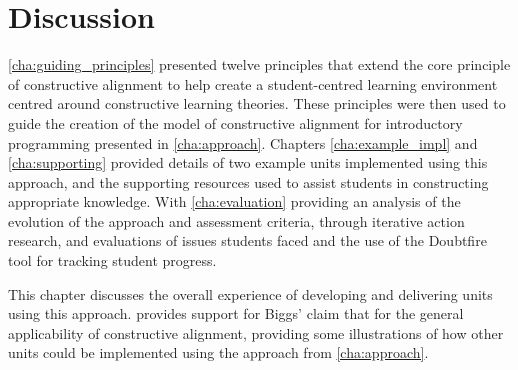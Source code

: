 
\chapter{Discussion} %
\label{cha:discussion}

\graphicspath{{Figures/Discussion/}}

\cref{cha:guiding_principles} presented twelve principles that extend the core principle of constructive alignment to help create a student-centred learning environment centred around constructive learning theories. These principles were then used to guide the creation of the model of constructive alignment for introductory programming presented in \cref{cha:approach}. Chapters \ref{cha:example_impl} and \ref{cha:supporting} provided details of two example units implemented using this approach, and the supporting resources used to assist students in constructing appropriate knowledge. With \cref{cha:evaluation} providing an analysis of the evolution of the approach and assessment criteria, through iterative action research, and evaluations of issues students faced and the use of the Doubtfire tool for tracking student progress. 

This chapter discusses the overall experience of developing and delivering units using this approach.  provides support for Biggs' claim that for the general applicability of constructive alignment, providing some illustrations of how other units could be implemented using the approach from \cref{cha:approach}. 







